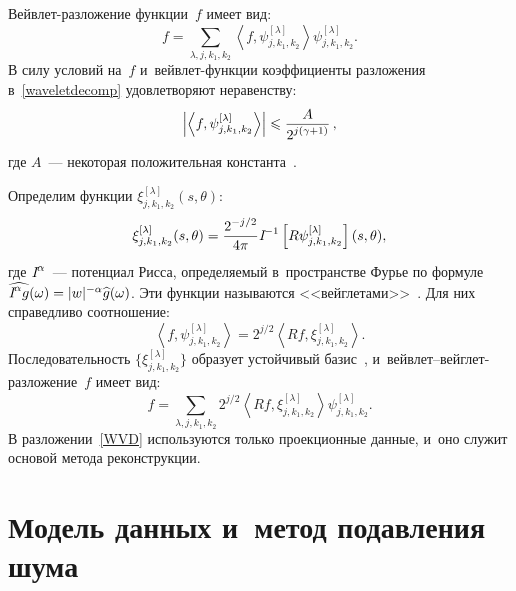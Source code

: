 \begin{multicols}{2}
Вейвлет-разложение функции~$f$ имеет вид:
%
\begin{equation} 
\label{waveletdecomp}
f = \sum\limits_{\lambda,j,k_1,k_2} \left\langle 
f,\psi^{[\lambda]}_{j,k_1,k_2}\right\rangle \psi^{[\lambda]}_{j,k_1,k_2}.
\end{equation}
В силу условий на~$f$ и~вейвлет-функции коэффициенты разложения 
в~\eqref{waveletdecomp} удовлетворяют неравенству:
\begin{equation*} 
\left|\left\langle f,\psi^{[\lambda]}_{j,k_1,k_2}\right\rangle\right| \leqslant 
\displaystyle\frac{\displaystyle A\mathstrut}{\displaystyle 2^{j(\gamma+1)}\mathstrut}\,,
\end{equation*}
где $A$~--- некоторая положительная константа~\cite{Mall99}.

Определим функции $\xi_{j,k_1,k_2}^{[\lambda]}(s,\theta)$:
%
\begin{equation*}
\xi_{j,k_1,k_2}^{[\lambda]}(s,\theta) = \displaystyle\frac{\displaystyle 2^{-j/2}\mathstrut}{\displaystyle 4\pi\mathstrut}
\textit{I}^{-1}\left[R\psi_{j,k_1,k_2}^{[\lambda]}\right](s,\theta),
\end{equation*}
где $\textit{I}^{\alpha}$~--- потенциал Рисса, определяемый в~пространстве 
Фурье по формуле $\widehat{\Riss^{\alpha} g}(\omega) \hm= |w|^{-\alpha} 
\widehat{g}(\omega)$.
Эти функции называются <<вейглетами>>~\cite{D94}. Для них справедливо 
соотношение:
\begin{equation*}
\left\langle f,\psi_{j,k_1,k_2}^{[\lambda]}\right\rangle=2^{j/2}\left\langle Rf, 
\xi_{j,k_1,k_2}^{[\lambda]}\right\rangle.
\end{equation*}
Последовательность $\{\xi_{j,k_1,k_2}^{[\lambda]}\}$ образует устойчивый 
базис~\cite{Lee97}, и~вейв\-лет--вейг\-лет-раз\-ло\-же\-ние~$f$ имеет вид:
\begin{equation} \label{WVD}
f = \sum\limits_{\lambda,j,k_1,k_2} 2^{j/2}\left\langle Rf, 
\xi_{j,k_1,k_2}^{[\lambda]}\right\rangle \psi^{[\lambda]}_{j,k_1,k_2}.
\end{equation}
В разложении~\eqref{WVD} используются только проекционные данные, и~оно 
служит основой метода реконструкции.


\section{Модель данных и~метод подавления шума}


\end{multicols}

